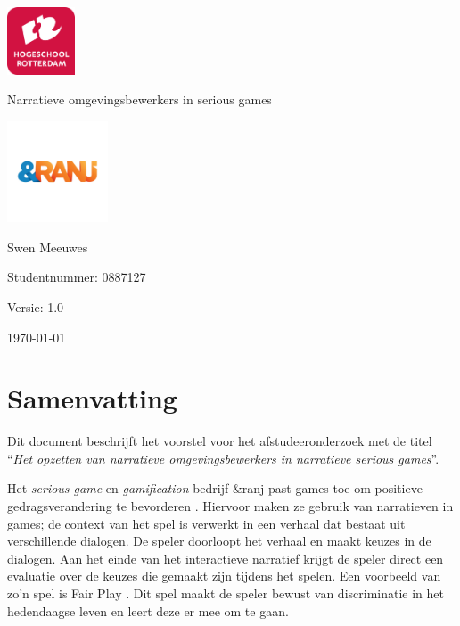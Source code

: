 \documentclass{report}
\newcommand{\versionnumber}{1.0}
\newcommand{\name}{Swen Meeuwes}
\newcommand{\studentnumber}{0887127}
\newcommand{\organisation}{\&ranj}
\renewcommand{\title}{Narratieve omgevingsbewerkers in serious games}
\newcommand{\subtitle}{}
\begin{document}
\begin{titlepage}
        \centering
        \includegraphics[width=2cm]{Images/University}\par
        \vspace{4\baselineskip}
        {\Huge\title\par}
        {\Large\subtitle\par}
        \par
        \includegraphics[width=3cm]{Images/Organisation}
        \vspace{4\baselineskip}
        \par
        {\Large\name\par}
        {Studentnummer: \studentnumber\par}
        \vfill
        {\hfill Versie: \versionnumber\par}
        {\hfill \today}
\end{titlepage}

\chapter*{Samenvatting}
Dit document beschrijft het voorstel voor het afstudeeronderzoek met de titel ``\emph{Het opzetten van narratieve omgevingsbewerkers in narratieve serious games}''.

Het \emph{serious game} en \emph{gamification} bedrijf \organisation{} past games toe om positieve gedragsverandering te bevorderen \cite{websiteranj}. Hiervoor maken ze gebruik van narratieven in games; de context van het spel is verwerkt in een verhaal dat bestaat uit verschillende dialogen. De speler doorloopt het verhaal en maakt keuzes in de dialogen. Aan het einde van het interactieve narratief krijgt de speler direct een evaluatie over de keuzes die gemaakt zijn tijdens het spelen. Een voorbeeld van zo'n spel is Fair Play \cite{fairplay}. Dit spel maakt de speler bewust van discriminatie in het hedendaagse leven en leert deze er mee om te gaan.
\end{document}
